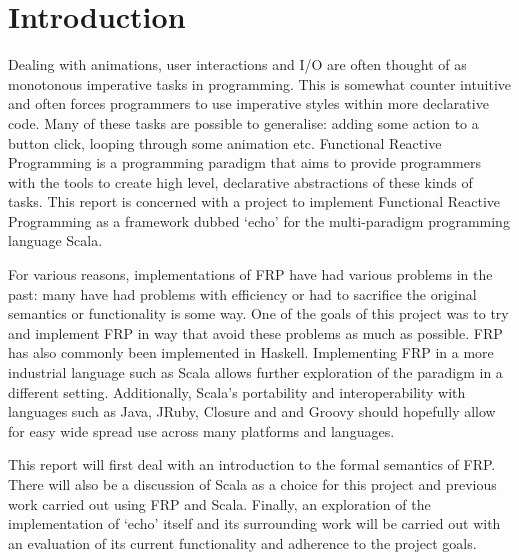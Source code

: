 \chapter{Introduction}

  Dealing with animations, user interactions and I/O are often thought of as monotonous imperative tasks
  in programming. This is somewhat counter intuitive and often forces programmers to use imperative
  styles within more declarative code. Many of these tasks are possible to generalise: adding
  some action to a button click, looping through some animation etc. Functional Reactive Programming
  is a programming paradigm that aims to provide programmers with the tools to create high level,
  declarative abstractions of these kinds of tasks. This report is concerned with a project to
  implement Functional Reactive Programming as a framework dubbed `echo' for the multi-paradigm programming language
  Scala.

  For various reasons, implementations of FRP have had various problems in the past: many have had problems
  with efficiency or had to sacrifice the original semantics or functionality is some way. One of the goals
  of this project was to try and implement FRP in way that avoid these problems as much as possible. FRP
  has also commonly been implemented in Haskell. Implementing FRP in a more industrial language such as Scala allows
  further exploration of the paradigm in a different setting. Additionally, Scala's portability and interoperability with
  languages such as Java, JRuby, Closure and and Groovy should hopefully allow for easy wide spread use across many platforms and languages. 

  This report will first deal with an introduction to the formal semantics of FRP. There will also be a discussion of Scala as a 
  choice for this project and previous work carried out using FRP and Scala.
  Finally, an exploration of the implementation of `echo' itself and its surrounding work will be carried out with an
  evaluation of its current functionality and adherence to the project goals.